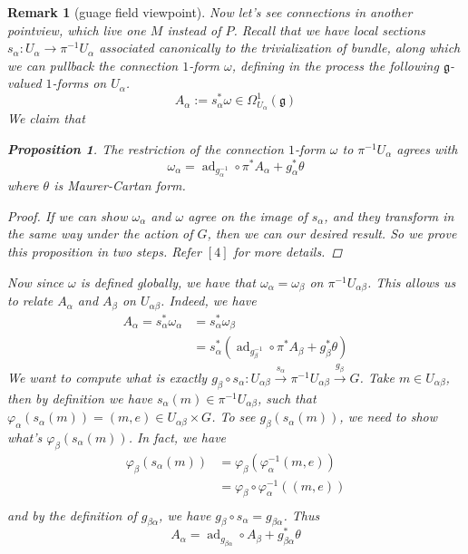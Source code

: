 \documentclass[11pt]{amsart}
\numberwithin{equation}{section}
\theoremstyle{plain}
\theoremstyle{plain}
\newtheorem{propsub}[thmsub]{Proposition}
\newtheorem{remksub}[thmsub]{Remark}
\numberwithin{equation}{section}
\begin{document}
\begin{remksub}[guage field viewpoint]\normalfont
Now let's see connections in another pointview, which live one $M$ instead of $P$. Recall that we have local sections $s_{\alpha}:U_{\alpha}\to\pi^{-1}U_{\alpha}$ associated canonically to the trivialization of bundle, along which we can pullback the connection $1$-form $\omega$, defining in the process the following $\mathfrak{g}$-valued $1$-forms on $U_{\alpha}$.
$$
A_{\alpha}:=s_{\alpha}^*\omega\in\Omega_{U_{\alpha}}^1(\mathfrak{g})
$$
We claim that
\begin{propsub}
The restriction of the connection $1$-form $\omega$ to $\pi^{-1}U_{\alpha}$ agrees with
$$
\omega_{\alpha}=\operatorname{ad}_{g_{\alpha}^{-1}}\circ\pi^*A_{\alpha}+g_{\alpha}^*\theta
$$
where $\theta$ is Maurer-Cartan form.
\end{propsub}
\begin{proof}
If we can show $\omega_{\alpha}$ and $\omega$ agree on the image of $s_{\alpha}$, and they transform in the same way under the action of $G$, then we can our desired result. So we prove this proposition in two steps. Refer $[4]$ for more details.
\end{proof}

Now since $\omega$ is defined globally, we have that $\omega_{\alpha}=\omega_{\beta}$ on $\pi^{-1}U_{\alpha\beta}$. This allows us to relate $A_{\alpha}$ and $A_{\beta}$ on $U_{\alpha\beta}$. Indeed, we have
$$
\begin{aligned}
A_{\alpha}=s^*_{\alpha}\omega_{\alpha}&=s_{\alpha}^*\omega_{\beta}\\
&=s_{\alpha}^*(\operatorname{ad}_{g_{\beta}^{-1}}\circ\pi^*A_{\beta}+g_{\beta}^*\theta)
\end{aligned}
$$
We want to compute what is exactly $g_{\beta}\circ s_{\alpha}:U_{\alpha\beta}\stackrel{s_{\alpha}}{\longrightarrow}\pi^{-1}U_{\alpha\beta}\stackrel{g_{\beta}}{\longrightarrow}G$. Take $m\in U_{\alpha\beta}$, then by definition we have $s_{\alpha}(m)\in\pi^{-1}U_{\alpha\beta}$, such that $\varphi_{\alpha}(s_{\alpha}(m))=(m,e)\in U_{\alpha\beta}\times G$. To see $g_{\beta}(s_{\alpha}(m))$, we need to show what's $\varphi_{\beta}(s_{\alpha}(m))$. In fact, we have
$$
\begin{aligned}
\varphi_{\beta}(s_{\alpha}(m))&=\varphi_{\beta}(\varphi_{\alpha}^{-1}(m,e))\\
&=\varphi_{\beta}\circ \varphi_{\alpha}^{-1}((m,e))\\
\end{aligned}
$$
and by the definition of $g_{\beta\alpha}$, we have $g_{\beta}\circ s_{\alpha}=g_{\beta\alpha}$. Thus 
\begin{equation}
A_{\alpha}=\operatorname{ad}_{g_{\beta\alpha}}\circ A_{\beta}+g_{\beta\alpha}^*\theta
\end{equation}
\end{remksub}
\end{document}
